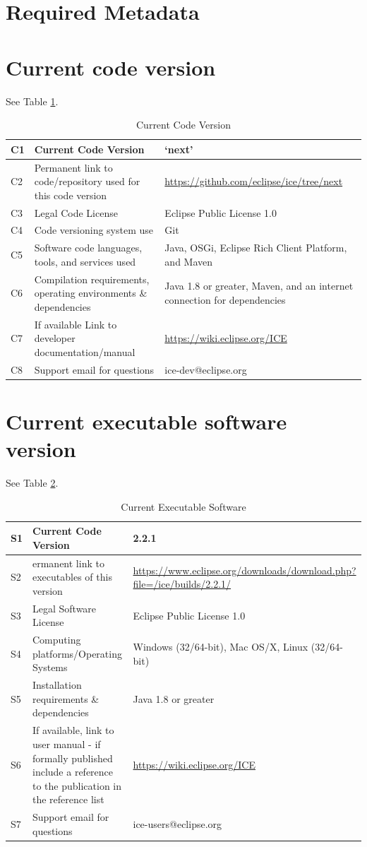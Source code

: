 \section*{Required Metadata}\label{required-metadata}

\section*{Current code version}\label{current-code-version}

See Table \ref{codeTable}.

\begin{table}[!htbp]
\begin{tabularx}{\textwidth}{|l|X|X|}
\hline
C1 & Current Code Version & `next'\tabularnewline\hline
C2 & Permanent link to code/repository used for this code version &
\url{https://github.com/eclipse/ice/tree/next}
\tabularnewline\hline
C3 & Legal Code License & Eclipse Public License 1.0 \tabularnewline\hline
C4 & Code versioning system use & Git \tabularnewline\hline
C5 & Software code languages, tools, and services used & Java, OSGi, Eclipse Rich Client Platform,
and Maven \tabularnewline\hline
C6 & Compilation requirements, operating environments \& dependencies & Java 1.8 or greater, Maven, and
an internet connection for dependencies \tabularnewline\hline 
C7 & If available Link to developer documentation/manual &
\url{https://wiki.eclipse.org/ICE} \tabularnewline\hline 
C8 & Support email for questions & ice-dev@eclipse.org \tabularnewline\hline
\end{tabularx}
\caption{Current Code Version}
\label{codeTable}
\end{table}

\section*{Current executable software
version}\label{current-executable-software-version}

See Table \ref{execTable}.

\begin{table}[!htbp]
\begin{tabularx}{\textwidth}{|l|X|X|}
\hline
S1 & Current Code Version & 2.2.1 \tabularnewline\hline
S2 & ermanent link to executables of this version &
\url{https://www.eclipse.org/downloads/download.php?file=/ice/builds/2.2.1/}
 \tabularnewline\hline 
S3 & Legal Software License & Eclipse Public License 1.0 \tabularnewline\hline
S4 & Computing platforms/Operating Systems & Windows (32/64-bit), Mac OS/X,
Linux (32/64-bit) \tabularnewline\hline 
S5 & Installation requirements \& dependencies & Java 1.8 or
greater \tabularnewline\hline
S6 & If available, link to user manual - if formally published include a
reference to the publication in the reference list &
\url{https://wiki.eclipse.org/ICE} \tabularnewline\hline 
S7 & Support email for questions & ice-users@eclipse.org \tabularnewline\hline
\end{tabularx}
\caption{Current Executable Software}
\label{execTable}
\end{table}